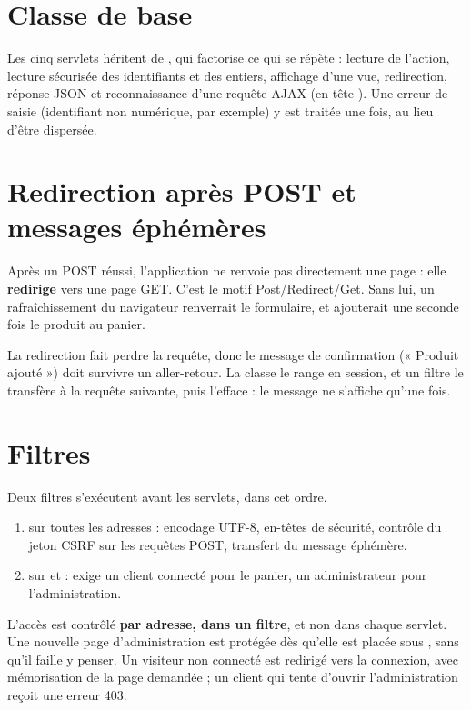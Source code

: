 \section{Classe de base}
Les cinq servlets héritent de , qui factorise ce qui se répète : lecture de l'action, lecture
sécurisée des identifiants et des entiers, affichage d'une vue, redirection, réponse JSON et reconnaissance d'une
requête AJAX (en-tête ). Une erreur de saisie (identifiant non numérique, par exemple) y est
traitée une fois, au lieu d'être dispersée.

\section{Redirection après POST et messages éphémères}
Après un POST réussi, l'application ne renvoie pas directement une page : elle \textbf{redirige} vers une page GET.
C'est le motif Post/Redirect/Get. Sans lui, un rafraîchissement du navigateur renverrait le formulaire, et ajouterait
une seconde fois le produit au panier.

La redirection fait perdre la requête, donc le message de confirmation (« Produit ajouté ») doit survivre un aller-retour.
La classe  le range en session, et un filtre le transfère à la requête suivante, puis l'efface : le
message ne s'affiche qu'une fois.

\section{Filtres}
Deux filtres s'exécutent avant les servlets, dans cet ordre.

\begin{enumerate}
  \item {} sur toutes les adresses : encodage UTF-8, en-têtes de sécurité, contrôle du jeton CSRF
        sur les requêtes POST, transfert du message éphémère.
  \item {} sur  et  : exige un client connecté pour le panier, un administrateur
        pour l'administration.
\end{enumerate}

L'accès est contrôlé \textbf{par adresse, dans un filtre}, et non dans chaque servlet. Une nouvelle page d'administration est
protégée dès qu'elle est placée sous , sans qu'il faille y penser. Un visiteur non connecté est redirigé vers la
connexion, avec mémorisation de la page demandée ; un client qui tente d'ouvrir l'administration reçoit une erreur 403.

